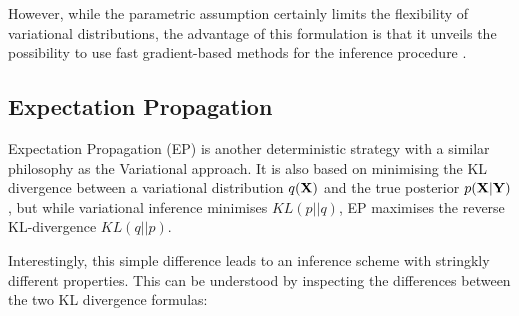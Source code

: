 However, while the parametric assumption certainly limits the flexibility of variational distributions, the advantage of this formulation is that it unveils the possibility to use fast gradient-based methods for the inference procedure \cite{Hoffman2012,Ranganath2014}.


\subsection{Expectation Propagation}  \label{section:expectation_propagation}

Expectation Propagation (EP) is another deterministic strategy with a similar philosophy as the Variational approach. It is also based on minimising the KL divergence between a variational distribution $q({\bf X})$ and the true posterior $p({\bf X}|{\bf Y})$, but while variational inference minimises $KL(p||q)$, EP maximises the reverse KL-divergence $KL(q||p)$.

Interestingly, this simple difference leads to an inference scheme with stringkly different properties. This can be understood by inspecting the differences between the two KL divergence formulas:


